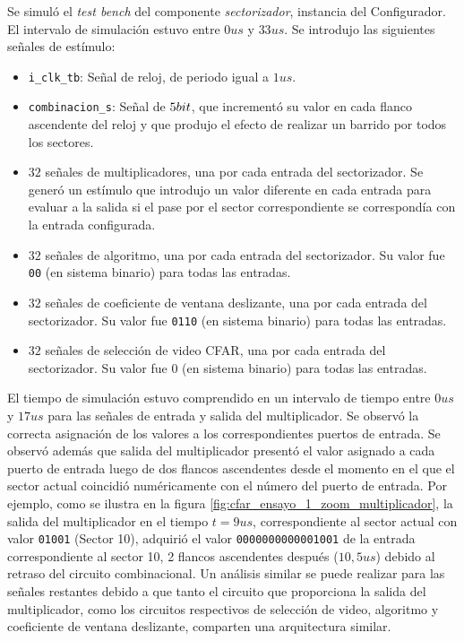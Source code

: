 Se simuló el \textit{test bench} del componente \textit{sectorizador}, instancia del Configurador. El intervalo de simulación estuvo entre $0 us$ y $33 us$. Se introdujo las siguientes señales de estímulo:

\begin{itemize}
\item
\texttt{i\_clk\_tb}: Señal de reloj, de periodo igual a $1 us$.

\item 
\texttt{combinacion\_s}: Señal de $5\-bit$, que incrementó su valor en cada flanco ascendente del reloj y que produjo el efecto de realizar un barrido por todos los sectores.

\item
$32$ señales de multiplicadores, una por cada entrada del sectorizador. Se generó un estímulo que introdujo un valor diferente en cada entrada para evaluar a la salida si el pase por el sector correspondiente se correspondía con la entrada configurada.

\item
$32$ señales de algoritmo, una por cada entrada del sectorizador. Su valor fue \texttt{00} (en sistema binario) para todas las entradas.

\item
$32$ señales de coeficiente de ventana deslizante, una por cada entrada del sectorizador. Su valor fue \texttt{0110} (en sistema binario) para todas las entradas.

\item
$32$ señales de selección de video CFAR, una por cada entrada del sectorizador. Su valor fue $0$ (en sistema binario) para todas las entradas.


\end{itemize}

El tiempo de simulación estuvo comprendido en un intervalo de tiempo entre $0 us$ y $17 us$ para las señales de entrada y salida del multiplicador. Se observó la correcta asignación de los valores a los correspondientes puertos de entrada. Se observó además que salida del multiplicador presentó el valor asignado a cada puerto de entrada luego de dos flancos ascendentes desde el momento en el que el sector actual coincidió numéricamente con el número del puerto de entrada. Por ejemplo, como se ilustra en la figura \ref{fig:cfar_ensayo_1_zoom_multiplicador}, la salida del multiplicador en el tiempo $t = 9 us$, correspondiente al sector actual con valor \texttt{01001} (Sector 10), adquirió el valor \texttt{0000000000001001} de la entrada correspondiente al sector 10, 2 flancos ascendentes después ($10,5 us$) debido al retraso del circuito combinacional. Un análisis similar se puede realizar para las señales restantes debido a que tanto el circuito que proporciona la salida del multiplicador, como los circuitos respectivos de selección de video, algoritmo y coeficiente de ventana deslizante, comparten una arquitectura similar.

